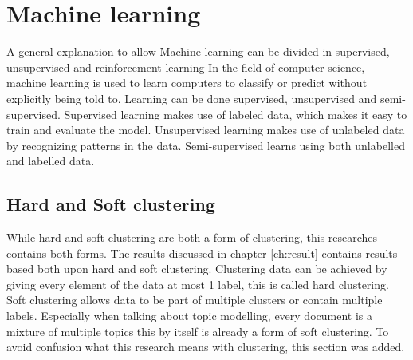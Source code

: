 \section{Machine learning}
A general explanation to allow
Machine learning can be divided in supervised, unsupervised and reinforcement learning
In the field of computer science, machine learning is used to learn computers to classify or predict without explicitly being told to. Learning can be done supervised, unsupervised and semi-supervised. Supervised learning makes use of labeled data, which makes it easy to train and evaluate the model. Unsupervised learning makes use of unlabeled data by recognizing patterns in the data. Semi-supervised learns using both unlabelled and labelled data.

\subsection{Hard and Soft clustering}
While hard and soft clustering are both a form of clustering, this researches contains both forms. The results discussed in chapter \ref{ch:result} contains results based both upon hard and soft clustering. Clustering data can be achieved by giving every element of the data at most 1 label, this is called hard clustering. Soft clustering allows data to be part of multiple clusters or contain multiple labels. Especially when talking about topic modelling, every document is a mixture of multiple topics this by itself is already a form of soft clustering. To avoid confusion what this research means with clustering, this section was added.
